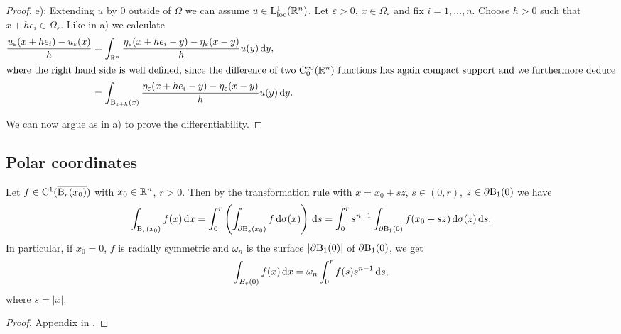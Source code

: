 \begin{enumerate}[i)]
\begin{proof}
    e): Extending $u$ by $0$ outside of $\Omega$ we can assume $u \in \mathrm{L}^1_{\operatorname{loc}}(\mathbb{R}^n)$.
    Let $\varepsilon > 0$, $x \in \Omega_\varepsilon$ and fix $i =1,\dots,n$. 
    Choose $h> 0$ such that $x + he_i \in \Omega_\varepsilon$. Like in a) we calculate
    \begin{align*}
    \frac{u_\varepsilon(x + h e_i) - u_\varepsilon(x)}{h}
    &= \int_{\mathbb{R}^n} \frac{\eta_\varepsilon(x + h e_i - y) - \eta_\varepsilon(x - y)}{h} u(y) \, {\operatorname{d}\!{y}}, \\
    \intertext{where the right hand side is well defined, since the difference of two $\mathrm{C}_0^\infty(\mathbb{R}^n)$ functions has again compact support and we furthermore deduce}
    &= \int_{\mathrm{B}_{\varepsilon + h}(x)} \frac{\eta_\varepsilon(x + h e_i - y) - \eta_\varepsilon(x - y)}{h} u(y) \, {\operatorname{d}\!{y}}.
  \end{align*}

    We can now argue as in a) to prove the differentiability.
  \end{proof}
\end{enumerate}

\subsection{Polar coordinates}

Let $f \in \mathrm{C}^1(\overline{\mathrm{B}_r(x_0)})$ with $x_0 \in \mathbb{R}^n$, $r > 0$. Then by the transformation rule with $x = x_0 + sz$, $s \in (0,r)$, $z \in \partial \mathrm{B}_1(0)$ we have
$$
\int_{\mathrm{B}_r(x_0)} f(x) \, {\operatorname{d}\!{x}} = \int_0^r \left( \int_{\partial \mathrm{B}_s(x_0)} f \, {\operatorname{d}\!{\sigma}}(x) \right) \, {\operatorname{d}\!{s}} = \int_0^r s^{n - 1} \int_{\partial \mathrm{B}_1(0)} f(x_0 + sz) \, {\operatorname{d}\!{\sigma}}(z) \, {\operatorname{d}\!{s}}.
$$
In particular, if $x_0 = 0$, $f$ is radially symmetric and $\omega_n$ is the surface $|\partial \mathrm{B}_1(0)|$ of $\partial \mathrm{B}_1(0)$, we get
$$
\int_{B_r(0)} f(x) \, {\operatorname{d}\!{x}} = \omega_n \int_0^r f(s) s^{n - 1} \, {\operatorname{d}\!{s}},
$$
where $s = |x|$.

\begin{proof}
  Appendix in \cite{evans2010partial}.
\end{proof}
